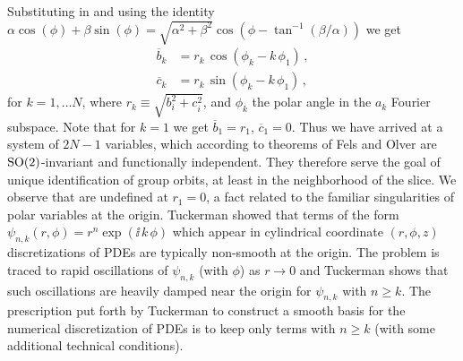 \documentclass[aip,cha,showpacs,reprint]{revtex4-1} %
\begin{document}
Substituting  in  and using the
identity
$\alpha\cos(\phi)+\beta\sin(\phi)=\sqrt{\alpha^2+\beta^2}\cos(\phi-\tan^{-1}(\beta/\alpha))$
we get
\bseq\label{eq:SO2polar}
  \begin{align}
    \overline{b}_k &=
		    r_k\, \cos(\phi_k-k\,\phi_1)\,, \label{eq:SO2polar1}\\
    \overline{c}_k &=
		    r_k\, \sin(\phi_k-k\,\phi_1)\,,\label{eq:SO2polar2}
  \end{align}
\eseq
for $k=1,\ldots N$, where $r_k\equiv\sqrt{b_i^2+c_i^2}$, and
$\phi_k$ the polar angle in the $a_k$ Fourier subspace.
Note that for $k=1$ we get $\overline{b}_1=r_1,\, \overline{c}_1=0$.
Thus we have arrived at a system of $2N-1$ variables, which according to
theorems of Fels and Olver are
$\textrm{SO}(2)$-invariant and functionally independent. They therefore serve the goal
of unique identification of group orbits, at least in the neighborhood of the
slice. We observe that  are undefined at $r_1=0$,
a fact related to the familiar singularities of polar variables at the origin.
Tuckerman showed that terms of the form $\psi_{n,k}(r,\phi)=r^n\exp(\ii\, k\,\phi)$
which appear in cylindrical coordinate $(r,\phi,z)$ discretizations of PDEs
are typically non-smooth at the origin. The problem is traced to rapid
oscillations of $\psi_{n,k}$ (with $\phi$) as $r\rightarrow0$ and Tuckerman shows
that such oscillations are heavily damped near the origin for
$\psi_{n,k}$ with $n\geq k$. The prescription put forth by Tuckerman to
construct a smooth basis for the numerical discretization of
PDEs is to keep only terms with $n\geq k$ (with some additional technical conditions).
\end{document}
